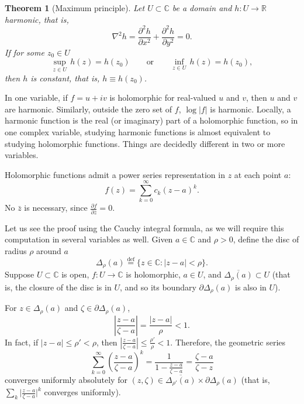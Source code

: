 \documentclass[12pt,openany]{book}
\newcommand{\sabs}[1]{\lvert {#1} \rvert}
\newcommand{\abs}[1]{\left\lvert {#1} \right\rvert}
\newcommand{\C}{{\mathbb{C}}}
\newcommand{\R}{{\mathbb{R}}}
\theoremstyle{plain}
\newtheorem{thm}{Theorem}[section]
\theoremstyle{remark}
\theoremstyle{definition}
\theoremstyle{exercise}
\theoremstyle{example}
\begin{document}
\begin{thm}[Maximum principle]
\pagebreak[2]
Let $U \subset \C$ be a domain and $h \colon U \to \R$
harmonic, that is,
%
\begin{equation*}
\nabla^2 h = \frac{\partial^2 h}{\partial x^2} + \frac{\partial^2 h}{\partial
y^2} = 0 .
\end{equation*}
If for some $z_0 \in U$
\begin{equation*}
\sup_{z \in U} \, h(z) = h(z_0)
\qquad \text{or} \qquad
\inf_{z \in U} \, h(z) = h(z_0) ,
\end{equation*}
then $h$ is constant, that is, $h \equiv h(z_0)$.
\end{thm}

In one variable, if $f = u+iv$ is holomorphic for real-valued $u$ and $v$,
then $u$ and $v$ are harmonic.
Similarly, outside the zero set of $f$, $\log \sabs{f}$ is harmonic.
Locally, a harmonic function is
the real (or imaginary) part of a holomorphic function, so in
one complex variable, studying
harmonic functions is almost equivalent to studying holomorphic
functions.  Things are decidedly different
in two or more variables.

\medskip

Holomorphic functions admit a power series representation in $z$
at each point $a$:
\begin{equation*}
f(z) = \sum_{k=0}^\infty c_k {(z-a)}^k .
\end{equation*}
No $\bar{z}$ is necessary,
since $\frac{\partial f}{\partial \bar{z}} = 0$.

Let us see the proof using the Cauchy integral formula, as we will
require this computation in several variables as well.
Given $a \in \C$ and $\rho > 0$, define the disc of radius $\rho$ around $a$
%
\begin{equation*}
\Delta_\rho(a)
\overset{\text{def}}{=}
\bigl\{ z \in \C : \sabs{z-a} < \rho \bigr\} .
\end{equation*}
Suppose $U \subset \C$ is open, $f \colon U \to \C$ is holomorphic,
$a \in U$, and $\overline{\Delta_\rho(a)} \subset U$ (that is, the closure
of the disc is in $U$, and so its boundary $\partial \Delta_\rho(a)$ is also in $U$).

For $z \in \Delta_\rho(a)$ and $\zeta \in \partial \Delta_\rho(a)$,
\begin{equation*}
\abs{\frac{z-a}{\zeta-a}} =
\frac{\sabs{z-a}}{\rho} < 1 .
\end{equation*}
In fact, if $\sabs{z-a} \leq \rho' < \rho$, then
$\abs{\frac{z-a}{\zeta-a}} \leq \frac{\rho'}{\rho} < 1$.  Therefore,
the geometric series
\begin{equation*}
\sum_{k=0}^\infty
{\left(\frac{z-a}{\zeta-a}\right)}^k
=
\frac{1}{1-
\frac{z-a}{\zeta-a}}
=
\frac{\zeta-a}{\zeta-z}
\end{equation*}
converges uniformly absolutely for $(z,\zeta) \in \overline{\Delta_{\rho'}(a)}
\times \partial \Delta_\rho(a)$ (that is, $\sum_k {\bigl\lvert
\frac{z-a}{\zeta-a} \bigr\rvert}^k$
converges uniformly).
\end{document}
